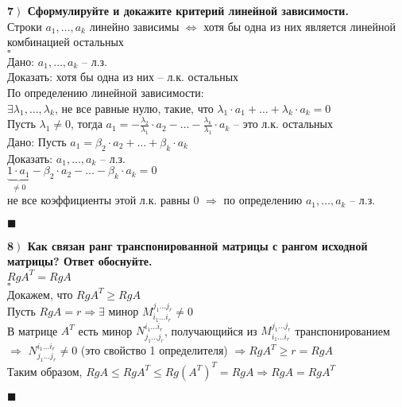 \documentclass[a4paper,12pt]{article}
\begin{document}
    \textbf{7$\left.\right)$ Сформулируйте и докажите критерий линейной зависимости.}\\
    Строки $a_1, \ldots, a_k$ линейно зависимы $\Leftrightarrow$ хотя бы одна из них является линейной комбинацией остальных\\
    $\square$\\
    Дано: $a_1, \ldots, a_k$ -- л.з.\\
    Доказать: хотя бы одна из них -- л.к. остальных\\
    По определению линейной зависимости:\\
    $\exists \lambda_1, \ldots, \lambda_k$, не все равные нулю, такие, что $\lambda_1\cdot a_1+\ldots+\lambda_k\cdot a_k=0$\\
    Пусть $\lambda_1\ne0$, тогда $a_1=-\frac{\lambda_2}{\lambda_1}\cdot a_2-\ldots-\frac{\lambda_k}{\lambda_1}\cdot a_k$ -- это л.к. остальных\\
    Дано: Пусть $a_1=\beta_2\cdot a_2+\ldots+\beta_k\cdot a_k$\\
    Доказать: $a_1, \ldots,  a_k$ -- л.з.\\
    $\underbrace{1\cdot a_1}_{\ne0}-\beta_2\cdot a_2-\ldots-\beta_k\cdot a_k=0$\\
    не все коэффициенты этой л.к. равны 0 $\Rightarrow$ по определению $a_1, \ldots, a_k$ -- л.з.
    \begin{flushright}
        $\blacksquare$
    \end{flushright}

    \textbf{8$\left.\right)$ Как связан ранг транспонированной матрицы с рангом исходной матрицы? Ответ обоснуйте.}\\ $RgA^T=RgA$\\
    $\square$\\
    Докажем, что $RgA^T\geq RgA$\\
    Пусть $RgA=r\Rightarrow\exists$ минор $M_{i_1\ldots i_r}^{j_1\ldots j_r}\ne 0$\\
    В матрице $A^T$ есть минор $N_{j_1\ldots j_r}^{i_1\ldots i_r}$, получающийся из $M_{i_1\ldots i_r}^{j_1\ldots j_r}$ транспонированием $\Rightarrow$ $N_{j_1\ldots j_r}^{i_1\ldots i_r}\ne0$ (это свойство 1 определителя) $\Rightarrow RgA^T\geq r=RgA$\\
    Таким образом, $RgA\leq RgA^T\leq Rg(A^T)^T=RgA \Rightarrow RgA=RgA^T$
    \begin{flushright}
        $\blacksquare$
    \end{flushright}
\end{document}
